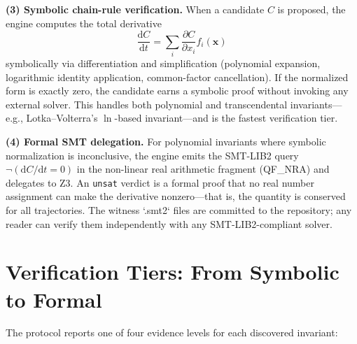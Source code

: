 \textbf{(3) Symbolic chain-rule verification.} When a candidate $C$ is proposed, the engine computes the total derivative
\begin{equation}
\frac{\mathrm{d}C}{\mathrm{d}t} = \sum_i \frac{\partial C}{\partial x_i} f_i(\mathbf{x})
\end{equation}
symbolically via differentiation and simplification (polynomial expansion, logarithmic identity application, common-factor cancellation). If the normalized form is exactly zero, the candidate earns a symbolic proof without invoking any external solver. This handles both polynomial and transcendental invariants---e.g., Lotka--Volterra's $\ln$-based invariant---and is the fastest verification tier.

\textbf{(4) Formal SMT delegation.} For polynomial invariants where symbolic normalization is inconclusive, the engine emits the SMT-LIB2 query $\neg(\mathrm{d}C/\mathrm{d}t = 0)$ in the non-linear real arithmetic fragment (QF\_NRA) and delegates to Z3. An \texttt{unsat} verdict is a formal proof that no real number assignment can make the derivative nonzero---that is, the quantity is conserved for all trajectories. The witness `.smt2` files are committed to the repository; any reader can verify them independently with any SMT-LIB2-compliant solver.

\section{Verification Tiers: From Symbolic to Formal}

The protocol reports one of four evidence levels for each discovered invariant:

